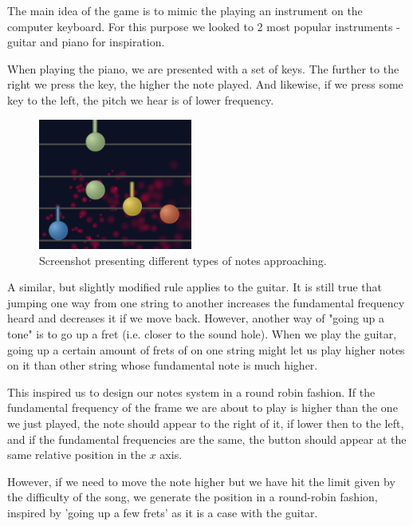 The main idea of the game is to mimic the playing an instrument on the computer keyboard. For this purpose we looked to 2 most popular instruments - guitar and piano for inspiration. 


When playing the piano, we are presented with a set of keys. The further to the right we press the key, the higher the note played. And likewise, if we press some key to the left, the pitch we hear is of lower frequency. 

\begin{figure}
  \begin{center}
    \includegraphics[width=0.45\textwidth]{Figures/NotesComing}
  \end{center}
  \caption{Screenshot presenting different types of notes approaching.}
\label{fig:notetypes}
\end{figure}

A similar, but slightly modified rule applies to the guitar. It is still true that jumping one way from one string to another increases the fundamental frequency heard and decreases it if we move back. However, another way of "going up a tone" is to go up a fret (i.e. closer to the sound hole). When we play the guitar, going up a certain amount of frets of on one string might let us play higher notes on it than other string whose fundamental note is much higher. 

This inspired us to design our notes system in a round robin fashion. If the fundamental frequency of the frame we are about to play is higher than the one we just played, the note should appear to the right of it, if lower then to the left, and if the fundamental frequencies are the same, the button should appear at the same relative position in the $x$ axis. 

However, if we need to move the note higher but we have hit the limit given by the difficulty of the song, we generate the position in a round-robin fashion, inspired by 'going up a few frets' as it is a case with the guitar.

